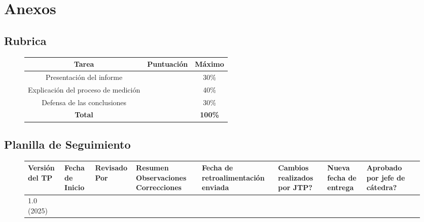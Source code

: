 \documentclass[a4paper,12pt, spanish]{report}
\newcommand\myemptypage{
  \newpage
  \null
  \thispagestyle{empty}
  \addtocounter{page}{-1}
  \newpage
}
\begin{document}
      \myemptypage
    \chapter{Anexos}
      \section{Rubrica}
      \begin{figure}[!h]
        \centering
        \begin{tabular}[c]{|c|c|c|}
          \rowcolor{gray!30}
          \hline
          \textbf{Tarea}                      & \textbf{Puntuación} & \textbf{Máximo}\\
          \hline
          Presentación del informe            &                     & 30\%\\
          \hline
          Explicación del proceso de medición &                     & 40\%\\
          \hline
          Defensa de las conclusiones         &                     & 30\%\\
          \hline
          \textbf{Total}                      &                     & \textbf{100\%}\\
          \hline
        \end{tabular}
      \end{figure}

      \section{Planilla de Seguimiento}
      \begin{figure}[!h]
        \begin{footnotesize}
          \begin{tabular}{|m{1cm}|m{1cm}|m{1.3cm}|m{2cm}|m{1.7cm}|m{1.7cm}|m{1.7cm}|m{1.7cm}|m{1.7cm}|}
            \hline
            Versión del TP & Fecha de Inicio & Revisado Por & Resumen Observaciones Correcciones &
            Fecha de retroalimentación enviada & Cambios realizados por JTP? & Nueva fecha de entrega &
            Aprobado por jefe de cátedra?\\
            \hline
            1.0 (2025) & & & & & & &\\
            \hline
          \end{tabular}
        \end{footnotesize}
      \end{figure}
\end{document}
